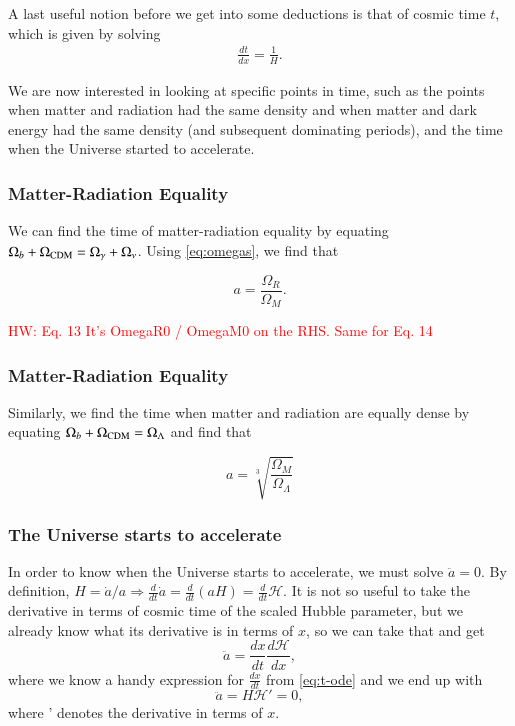 \documentclass{aa}
\newcommand{\hw}[1]{\textcolor{red}{HW: #1}}
\begin{document}
A last useful notion before we get into some deductions is that of cosmic time $t$, which is given by solving
\begin{align}
\label{eq:t-ode}
\frac{dt}{dx} = \frac{1}{H}.
\end{align}

We are now interested in looking at specific points in time, such as the points when matter and radiation had the same density and when matter and dark energy had the same density (and subsequent dominating periods), and the time when the Universe started to accelerate.

\subsubsection{Matter-Radiation Equality}

We can find the time of matter-radiation equality by equating $
\Omega_b + \Omega_{\rm CDM} = \Omega_\gamma + \Omega_{\nu}$. Using \eqref{eq:omegas}, we find that

\begin{equation}
    a = \frac{\Omega_R}{\Omega_M}.
\end{equation}

\hw{Eq. 13 It's OmegaR0 / OmegaM0 on the RHS. Same for Eq. 14}

\subsubsection{Matter-Radiation Equality}

Similarly, we find the time when matter and radiation are equally dense by equating $\Omega_b + \Omega_{\rm CDM} = \Omega_{\Lambda}$ and find that

\begin{equation}
    a = \sqrt[3]{\frac{\Omega_M}{\Omega_{\Lambda}}}
\end{equation}

\subsubsection{The Universe starts to accelerate}

In order to know when the Universe starts to accelerate, we must solve $\ddot a = 0$. By definition, $H = \dot{a}/a \Rightarrow \frac{d}{dt} \dot a = \frac{d}{dt} (aH) = \frac{d}{dt}\mathcal H$. It is not so useful to take the derivative in terms of cosmic time of the scaled Hubble parameter, but we already know what its derivative is in terms of $x$, so we can take that and get
\begin{equation}
    \ddot a = \frac{dx}{dt}\frac{d\mathcal H}{dx},
\end{equation}
where we know a handy expression for $\frac{dx}{dt}$ from \eqref{eq:t-ode} and we end up with
\begin{equation}
    \ddot a = H\mathcal{H'} = 0,
\end{equation}
where ' denotes the derivative in terms of $x$.
\end{document}
